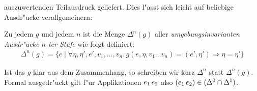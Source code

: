 \documentclass[12pt,a4paper]{article}
\begin{document}
auszuwertenden Teilausdruck geliefert. Dies l"asst sich leicht auf beliebige Ausdr"ucke verallgemeinern:
\begin{definition}[Umgebungsinvarianz]
  Zu jedem $g$ und jedem $n$ ist die Menge $\Delta^n(g)$ aller \emph{umgebungsinvarianten Ausdr"ucke $n$-ter Stufe}
  wie folgt definiert:
  \[\begin{array}{c}
    \Delta^n(g) = \{e \mid \forall \eta,\eta',e',v_1,\ldots,v_n.\,g(e,\eta,v_1 \ldots v_n)=(e',\eta') \Rightarrow \eta = \eta'\}
  \end{array}\]
\end{definition}
Ist das $g$ klar aus dem Zusammenhang, so schreiben wir kurz $\Delta^n$ statt $\Delta^n(g)$.
Formal ausgedr"uckt gilt f"ur Applikationen ${e_1}\,{e_2}$ also $({e_1}\,{e_2}) \in (\Delta^0 \cap \Delta^1)$.
\end{document}
